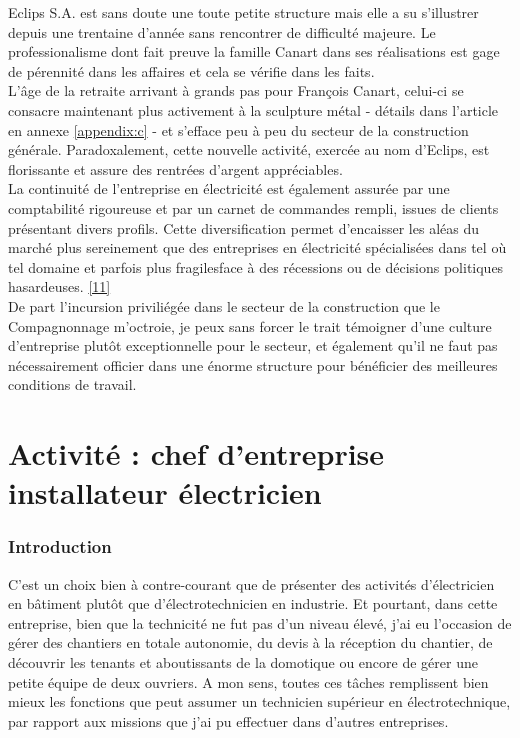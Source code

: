 \documentclass[a4paper, 12pt]{article}
\begin{document}
Eclips S.A. est sans doute une toute petite structure mais elle a su s'illustrer depuis une trentaine d'année sans rencontrer de difficulté majeure. Le professionalisme dont fait preuve la famille Canart dans ses réalisations est gage de pérennité dans les affaires et cela se vérifie dans les faits.\\L'âge de la retraite arrivant à grands pas pour François Canart, celui-ci se consacre maintenant plus activement à la sculpture métal - détails dans l'article en annexe \ref{appendix:c} - et s'efface peu à peu du secteur de la construction générale. Paradoxalement, cette nouvelle activité, exercée au nom d'Eclips, est florissante et assure des rentrées d'argent appréciables.\\La continuité de l'entreprise en électricité est également assurée par une comptabilité rigoureuse et par un carnet de commandes rempli, issues de clients présentant divers profils. Cette diversification permet d'encaisser les aléas du marché plus sereinement que des entreprises en électricité spécialisées dans tel où tel domaine et parfois plus fragilesface à des récessions ou de décisions politiques hasardeuses. \href{https://www.rtl.be/info/regions/brabant-wallon/les-entreprises-de-photovoltaique-continuent-de-tomber-sunswitch-fait-faillite-60-emplois-perdus-414257.aspx}{[11]}\\

De part l'incursion priviliégée dans le secteur de la construction que le Compagnonnage m'octroie, je peux sans forcer le trait témoigner d'une culture d'entreprise plutôt exceptionnelle pour le secteur, et également qu'il ne faut pas nécessairement officier dans une énorme structure pour bénéficier des meilleures conditions de travail.\\

\newpage

\part{Activité : chef d'entreprise installateur électricien}

\setcounter{section}{0} 

 \section{Introduction}

C'est un choix bien à contre-courant que de présenter des activités d'électricien en bâtiment plutôt que d'électrotechnicien en industrie. Et pourtant, dans cette entreprise, bien que la technicité ne fut pas d'un niveau élevé, j'ai eu l'occasion de gérer des chantiers en totale autonomie, du devis à la réception du chantier, de découvrir les tenants et aboutissants de la domotique ou encore de gérer une petite équipe de deux ouvriers. A mon sens, toutes ces tâches remplissent bien mieux les fonctions que peut assumer un technicien supérieur en électrotechnique, par rapport aux missions que j'ai pu effectuer dans d'autres entreprises.\\
\end{document}
